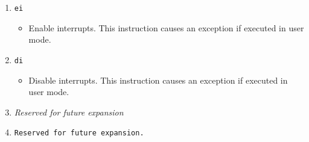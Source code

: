 \documentclass{article}
\begin{document}
\begin{itemize}
\begin{enumerate}
			\item \texttt{ei}
				\begin{itemize}
				\item Enable interrupts.  This instruction causes an
					exception if executed in user mode.
				\end{itemize}
			\item \texttt{di}
				\begin{itemize}
				\item Disable interrupts.  This instruction causes an
					exception if executed in user mode.
				\end{itemize}
			\item \textit{Reserved for future expansion}
			\item \texttt{Reserved for future expansion.}

			\end{enumerate}
		\end{itemize}



\end{document}
